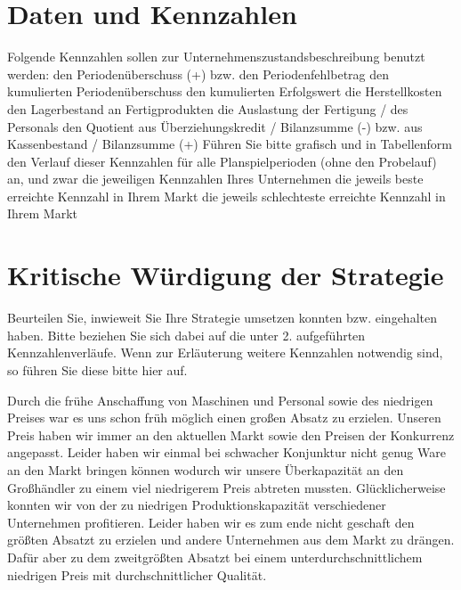 \documentclass[12pt]{article}
\begin{document}
\section{Daten und Kennzahlen}
Folgende Kennzahlen sollen zur Unternehmenszustandsbeschreibung benutzt werden:
den Periodenüberschuss (+) bzw. den Periodenfehlbetrag
den kumulierten Periodenüberschuss
den kumulierten Erfolgswert
die Herstellkosten
den Lagerbestand an Fertigprodukten
die Auslastung der Fertigung / des Personals
den Quotient aus Überziehungskredit / Bilanzsumme (-) 
bzw. aus Kassenbestand / Bilanzsumme (+)
Führen Sie bitte grafisch und in Tabellenform den Verlauf dieser Kennzahlen für alle Planspielperioden (ohne den Probelauf) an, und zwar
die jeweiligen Kennzahlen Ihres Unternehmen
die jeweils beste erreichte Kennzahl in Ihrem Markt
die jeweils schlechteste erreichte Kennzahl in Ihrem Markt



\section{Kritische Würdigung der Strategie}
Beurteilen Sie, inwieweit Sie Ihre Strategie umsetzen konnten bzw. eingehalten haben.
Bitte beziehen Sie sich dabei auf die unter 2. aufgeführten Kennzahlenverläufe.
Wenn zur Erläuterung weitere Kennzahlen notwendig sind, so führen Sie diese bitte hier auf.

Durch die frühe Anschaffung von Maschinen und Personal sowie des niedrigen Preises war es uns schon früh möglich einen großen Absatz zu erzielen.
Unseren Preis haben wir immer an den aktuellen Markt sowie den Preisen der Konkurrenz angepasst.
Leider haben wir einmal bei schwacher Konjunktur nicht genug Ware an den Markt bringen können wodurch wir unsere Überkapazität an den Großhändler zu einem viel niedrigerem Preis abtreten mussten.
Glücklicherweise konnten wir von der zu niedrigen Produktionskapazität verschiedener Unternehmen profitieren.
Leider haben wir es zum ende nicht geschaft den größten Absatzt zu erzielen und andere Unternehmen aus dem Markt zu drängen.
Dafür aber zu dem zweitgrößten Absatzt bei einem unterdurchschnittlichem niedrigen Preis mit durchschnittlicher Qualität.
\end{document}
